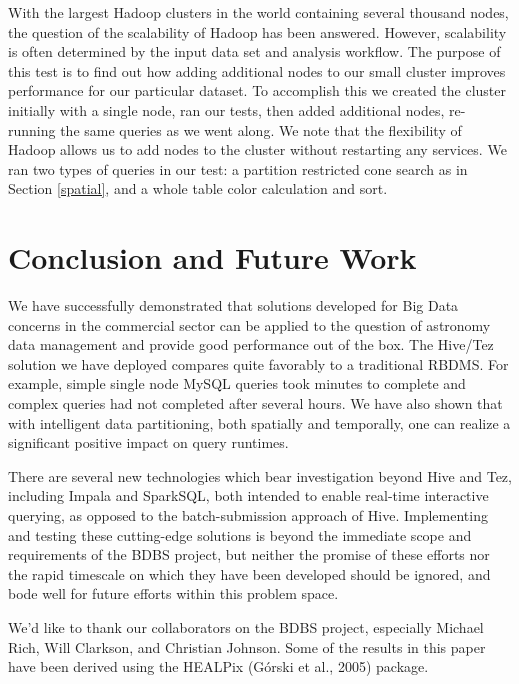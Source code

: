 \documentclass[11pt,twoside]{article}
\begin{document}

With the largest Hadoop clusters in the world containing several thousand nodes, the question of the
scalability of Hadoop has been answered. However, scalability is often determined by the input data set and
analysis workflow. The purpose of this test is to find out how adding additional nodes to our small cluster
improves performance for our particular dataset.  To accomplish this we created the cluster initially with a
single node, ran our tests, then added additional nodes, re-running the same queries as we went along.  We
note that the flexibility of Hadoop allows us to add nodes to the cluster without restarting any services.  We
ran two types of queries in our test: a partition restricted cone search as in Section \ref{spatial}, and a
whole table color calculation and sort.

\section{Conclusion and Future Work}

We have successfully demonstrated that solutions developed for Big Data concerns in the commercial sector can
be applied to the question of astronomy data management and provide good performance out of the box. The
Hive/Tez solution we have deployed compares quite favorably to a traditional RBDMS. For example, simple single
node MySQL queries took minutes to complete and complex queries had not completed after several hours.  We
have also shown that with intelligent data partitioning, both spatially and temporally, one can realize a
significant positive impact on query runtimes.

There are several new technologies which bear investigation beyond Hive and Tez, including Impala and
SparkSQL, both intended to enable real-time interactive querying, as opposed to the batch-submission approach
of Hive.  Implementing and testing these cutting-edge solutions is beyond the immediate scope and requirements
of the BDBS project, but neither the promise of these efforts nor the rapid timescale on which they have been
developed should be ignored, and bode well for future efforts within this problem space.

\acknowledgements We'd like to thank our collaborators on the BDBS project, especially Michael Rich, Will
Clarkson, and Christian Johnson. Some of the results in this paper have been derived using the HEALPix (Górski et al., 2005) package.


\end{document}
